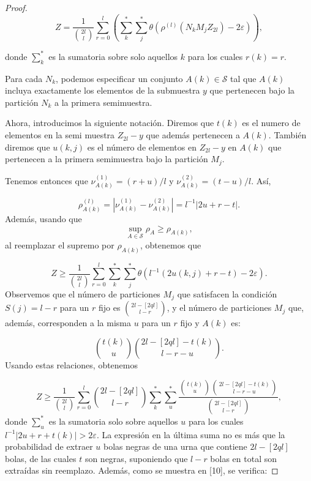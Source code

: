 \documentclass{report}
\begin{document}
\begin{proof}
\[
Z = \frac{1}{\binom{2l}{l}} \sum_{r=0}^{l} \left( \sum_k^* \sum_j^* \theta ( \rho^{(l)} (N_k M_j Z_{2l}) - 2\varepsilon ) \right),
\]

donde \( \displaystyle\sum_k^* \) es la sumatoria sobre solo aquellos \( k \) para los cuales \( r(k) = r \).\newline

Para cada \( N_k \), podemos especificar un conjunto \( A(k) \in \mathcal{S} \) tal que \( A(k) \) incluya exactamente
los elementos de la submuestra \( y \) que pertenecen bajo la partición \( N_k \) a la primera semimuestra.\newline

Ahora, introducimos la siguiente notación. Diremos que $t(k)$ es el numero de elementos en la semi muestra $Z_{2l} - y$ que
además pertenecen a $A(k)$. También diremos que  \( u(k,j) \) es el número de elementos en \( Z_{2l} - y \) en \( A(k) \)
que pertenecen a la primera semimuestra bajo la partición \( M_j \).\newline

Tenemos entonces que \( \nu_{A(k)}^{(1)} = (r + u)/l \) y \( \nu_{A(k)}^{(2)} = (t - u)/l \).
Así, 

\[
\rho^{(l)}_{A(k)} = |\nu_{A(k)}^{(1)} - \nu_{A(k)}^{(2)}| = l^{-1} | 2u + r - t |.
\]
Además, usando que 
\[ 
\sup_{A \in \mathcal{S}} \rho_A \geq \rho_{A(k)},
\] 
al reemplazar el supremo por $\rho_{A(k)}$, obtenemos que

\[
Z \geq \frac{1}{\binom{2l}{l}} \sum_{r=0}^{l} \sum_k^* \sum_j^* \theta ( l^{-1} (2u(k,j) + r - t) - 2\varepsilon ).
\]
Observemos que el número de particiones \( M_j \) que satisfacen la condición \( S(j) = l - r \) para un \( r \) fijo es
\( \binom{2l - [2q l]}{l - r} \), y el número de particiones \( M_j \) que, además, corresponden a la misma \( u \) para un \( r \) fijo
y \( A(k) \) es:

\[
\binom{t(k)}{u} \binom{2l - [2q l] - t(k)}{l - r - u}.
\]
Usando estas relaciones, obtenemos

\[
Z \geq \frac{1}{\binom{2l}{l}} \sum_{r=0}^{l} \binom{2l - [2q l]}{l - r} \sum_k^* \sum_u^* \frac{\binom{t(k)}{u} \binom{2l - [2q l] - t(k)}{l - r - u}}{\binom{2l - [2q l]}{l - r}},
\]
donde \( \sum_u^* \) es la sumatoria solo sobre aquellos \( u \) para los cuales \( l^{-1} |2u + r + t(k)| > 2\varepsilon \).
La expresión en la última suma no es más que la probabilidad de extraer \( u \) bolas negras de una urna que contiene
\( 2l - [2q l] \) bolas, de las cuales \( t \) son negras, suponiendo que \( l - r \) bolas en total son extraídas sin reemplazo.
Además, como se muestra en [10], se verifica: 


\end{proof}
\end{document}
